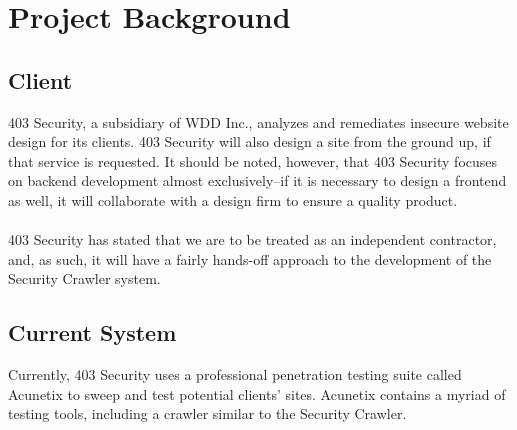 \section{Project Background}
\subsection{Client}
	403 Security, a subsidiary of WDD Inc., analyzes and remediates insecure website design for its clients.  403 Security will also design a site from the ground up, if that service is requested. It should be noted, however, that 403 Security focuses on backend development almost exclusively--if it is necessary to design a frontend as well, it will collaborate with a design firm to ensure a quality product. \\\\
403 Security has stated that we are to be treated as an independent contractor, and, as such, it will have a fairly hands-off approach to the development of the Security Crawler system.

\subsection{Current System}

	Currently, 403 Security uses a professional penetration testing suite called Acunetix to sweep and test potential clients' sites.  Acunetix contains a myriad of testing tools, including a crawler similar to the Security Crawler.


